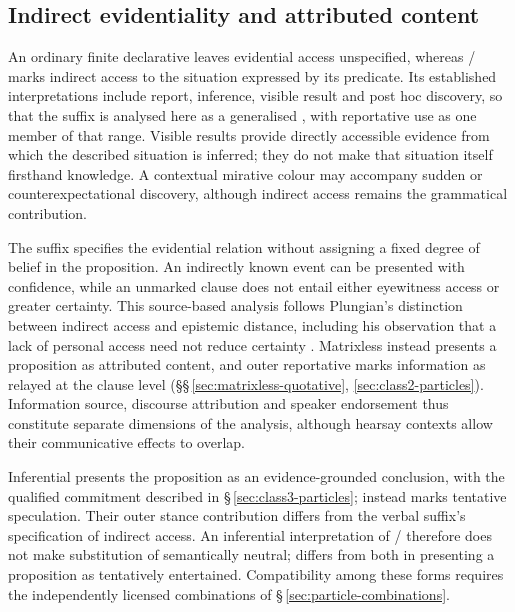 \subsection{Indirect evidentiality and attributed content}
\label{sec:complex-evidential}

An ordinary finite declarative leaves evidential access unspecified,
whereas / marks indirect access to the situation
expressed by its predicate. Its established interpretations include report,
inference, visible result and post hoc discovery, so that the suffix is
analysed here as a generalised , with reportative use
as one member of that range. Visible results provide directly accessible
evidence from which the described situation is inferred; they do not make
that situation itself firsthand knowledge. A contextual mirative colour
may accompany sudden or counterexpectational discovery, although indirect
access remains the grammatical contribution.

The suffix specifies the evidential relation without assigning a fixed
degree of belief in the proposition. An indirectly known event can be
presented with confidence, while an unmarked clause does not entail either
eyewitness access or greater certainty. This source-based analysis follows
Plungian's distinction between indirect access and epistemic distance,
including his observation that a lack of personal access need not reduce
certainty \cite[pp.~29--32]{plungian2010}. Matrixless  instead
presents a proposition as attributed content, and outer reportative
 marks information as relayed at the clause level
(§§\,\ref{sec:matrixless-quotative}, \ref{sec:class2-particles}).
Information source, discourse attribution and speaker endorsement thus
constitute separate dimensions of the analysis, although hearsay contexts
allow their communicative effects to overlap.

Inferential  presents the proposition as an evidence-grounded
conclusion, with the qualified commitment described in
§\,\ref{sec:class3-particles};  instead marks tentative
speculation. Their outer stance contribution differs from the verbal
suffix's specification of indirect access. An inferential interpretation
of / therefore does not make substitution of
 semantically neutral;  differs from both in
presenting a proposition as tentatively entertained. Compatibility among these forms
requires the independently licensed combinations of
§\,\ref{sec:particle-combinations}.

